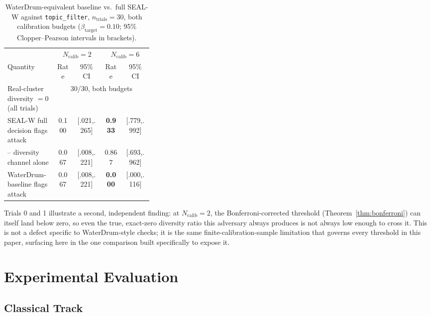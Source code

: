 \documentclass[10pt,journal,compsoc]{IEEEtran}
\begin{document}
\begin{table}[t]
\centering
\footnotesize
\caption{WaterDrum-equivalent baseline vs.\ full SEAL-W against \texttt{topic\_filter}, $n_{\text{trials}}=30$, both calibration budgets ($\beta_{\text{target}}=0.10$; 95\% Clopper--Pearson intervals in brackets).}
\label{tab:waterdrum}
\begin{tabular}{@{}p{0.34\linewidth}cccc@{}}
\toprule
& \multicolumn{2}{c}{$N_{\text{calib}}{=}2$} & \multicolumn{2}{c}{$N_{\text{calib}}{=}6$} \\
Quantity & Rate & 95\% CI & Rate & 95\% CI \\
\midrule
Real-cluster diversity $=0$ (all trials) & \multicolumn{4}{c}{30/30, both budgets} \\
SEAL-W full decision flags attack & 0.100 & [.021,.265] & \textbf{0.933} & [.779,.992] \\
\quad -- diversity channel alone & 0.067 & [.008,.221] & 0.867 & [.693,.962] \\
WaterDrum-baseline flags attack & 0.067 & [.008,.221] & \textbf{0.000} & [.000,.116] \\
\bottomrule
\end{tabular}
\end{table}

Trials 0 and 1 illustrate a second, independent finding: at $N_{\text{calib}}=2$, the Bonferroni-corrected threshold (Theorem~\ref{thm:bonferroni}) can itself land below zero, so even the true, exact-zero diversity ratio this adversary always produces is not always low enough to cross it. This is not a defect specific to WaterDrum-style checks; it is the same finite-calibration-sample limitation that governs every threshold in this paper, surfacing here in the one comparison built specifically to expose it.

\section{Experimental Evaluation}
\label{sec:experiments}

\subsection{Classical Track}
\end{document}
